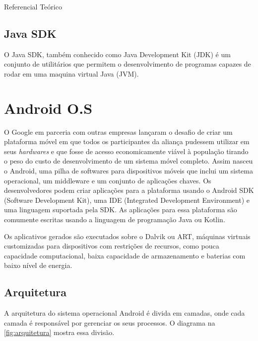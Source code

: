 \documentclass[
	12pt,				%
	openright,			%
	twoside,			%
	a4paper,			%
	english,			%
	french,				%
	spanish,			%
	brazil				%
	]{abntex2}
\begin{document}
\begin{chapter}{Referencial Teórico}
\subsection{Java SDK}
O Java SDK, também conhecido como Java Development Kit (JDK) é um conjunto de utilitários que permitem o desenvolvimento de programas capazes de rodar em uma maquina virtual Java (JVM).

\section{Android O.S}
O Google em parceria com outras empresas lançaram o desafio de criar um plataforma móvel em que todos os participantes da aliança pudessem utilizar em seus \textit{hardwares} e que fosse de acesso economicamente viável à população tirando o peso do custo de desenvolvimento de um sistema móvel completo. Assim nasceu o Android, uma pilha de softwares para dispositivos móveis que inclui um sistema operacional, um middleware e um conjunto de aplicações chaves. Os desenvolvedores podem criar aplicações para a plataforma usando o Android SDK (Software Development Kit), uma IDE (Integrated Development Environment) e uma linguagem suportada pela SDK. As aplicações para essa plataforma são comumente escritas usando a linguagem de programação Java ou Kotlin.

Os aplicativos gerados são executados sobre o Dalvik ou ART,  máquinas virtuais customizadas para dispositivos com restrições de recursos, como pouca capacidade computacional, baixa capacidade de armazenamento e baterias com baixo nível de energia.

\newpage
\subsection{Arquitetura}
A arquitetura do sistema operacional Android é divida em camadas, onde cada camada é responsável por gerenciar os seus processos. O diagrama na \autoref{fig:arquitetura} mostra essa divisão.


\end{chapter}
\end{document}
